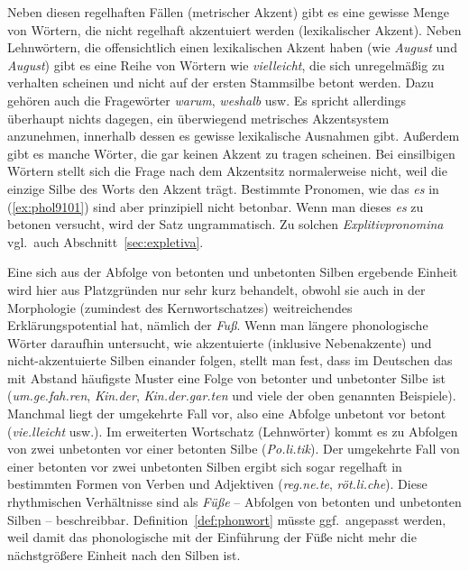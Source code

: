 Neben diesen regelhaften Fällen (metrischer Akzent) gibt es eine gewisse Menge von Wörtern, die nicht regelhaft akzentuiert werden (lexikalischer Akzent).
Neben Lehnwörtern, die offensichtlich einen lexikalischen Akzent haben (wie \textit{\Akz August} und \textit{Au\Akz gust}) gibt es eine Reihe von Wörtern wie \textit{vie\Akz lleicht}, die sich unregelmäßig zu verhalten scheinen und nicht auf der ersten Stammsilbe betont werden.
Dazu gehören auch die Fragewörter \textit{wa\Akz rum}, \textit{wes\Akz halb} usw.
Es spricht allerdings überhaupt nichts dagegen, ein überwiegend metrisches Akzentsystem anzunehmen, innerhalb dessen es gewisse lexikalische Ausnahmen gibt.
Außerdem gibt es manche Wörter, die gar keinen Akzent zu tragen scheinen.
Bei einsilbigen Wörtern stellt sich die Frage nach dem Akzentsitz normalerweise nicht, weil die einzige Silbe des Worts den Akzent trägt.
Bestimmte Pronomen, wie das \textit{es} in (\ref{ex:phol9101}) sind aber prinzipiell nicht betonbar.
Wenn man dieses \textit{es} zu betonen versucht, wird der Satz ungrammatisch.
Zu solchen \textit{Explitivpronomina} vgl.\ auch Abschnitt~\ref{sec:expletiva}.

\begin{exe}
  \ex\label{ex:phol9101}
  \begin{xlist}
  \end{xlist}
\end{exe}

Eine sich aus der Abfolge von betonten und unbetonten Silben ergebende Einheit wird hier aus Platzgründen nur sehr kurz behandelt, obwohl sie auch in der Morphologie (zumindest des Kernwortschatzes) weitreichendes Erklärungspotential hat, nämlich der \textit{Fuß}.
Wenn man längere phonologische Wörter daraufhin untersucht, wie akzentuierte (inklusive Nebenakzente) und nicht-akzentuierte Silben einander folgen, stellt man fest, dass im Deutschen das mit Abstand häufigste Muster eine Folge von betonter und unbetonter Silbe ist (\textit{\Akz um.ge.\Akz fah.ren}, \textit{\Akz Kin.der}, \textit{\Akz Kin.der.\Nakz gar.ten} und viele der oben genannten Beispiele).
Manchmal liegt der umgekehrte Fall vor, also eine Abfolge unbetont vor betont (\textit{vie.\Akz lleicht} usw.).
Im erweiterten Wortschatz (\idR Lehnwörter) kommt es zu Abfolgen von zwei unbetonten vor einer betonten Silbe (\textit{Po.li.\Akz tik}).
Der umgekehrte Fall von einer betonten vor zwei unbetonten Silben ergibt sich sogar regelhaft in bestimmten Formen von Verben und Adjektiven (\textit{\Akz reg.ne.te}, \textit{\Akz röt.li.che}).
Diese rhythmischen Verhältnisse sind als \textit{Füße} -- Abfolgen von betonten und unbetonten Silben -- beschreibbar.
Definition~\ref{def:phonwort} müsste ggf.\ angepasst werden, weil damit das phonologische mit der Einführung der Füße nicht mehr die nächstgrößere Einheit nach den Silben ist.

